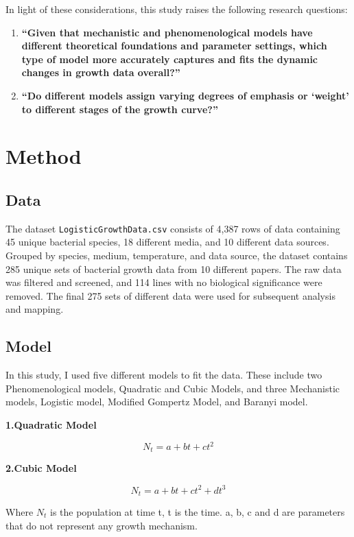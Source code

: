 \documentclass{article}
\begin{document}
In light of these considerations, this study raises the following research questions:

\begin{enumerate}
    \item \textbf{``Given that mechanistic and phenomenological models have different theoretical foundations and parameter settings, which type of model more accurately captures and fits the dynamic changes in growth data overall?''}
    
    \item \textbf{``Do different models assign varying degrees of emphasis or ‘weight’ to different stages of the growth curve?''}

\end{enumerate}

\section{Method}

\subsection{Data}

The dataset \texttt{LogisticGrowthData.csv} consists of 4,387 rows of data containing 45 unique bacterial species, 18 different media, and 10 different data sources. Grouped by species, medium, temperature, and data source, the dataset contains 285 unique sets of bacterial growth data from 10 different papers. The raw data was filtered and screened, and 114 lines with no biological significance were removed. The final 275 sets of different data were used for subsequent analysis and mapping.


\subsection{Model}

In this study, I used five different models to fit the data. These include two Phenomenological models, Quadratic and Cubic Models, and three Mechanistic models, Logistic model, Modified Gompertz Model, and Baranyi model.


\noindent \textbf{1.\;Quadratic Model}


\[
N_t = a + b t + c t^2 \tag{1}
\]


\noindent \textbf{2.\;Cubic Model}


\[
N_t = a + b t + c t^2 + d t^3 \tag{2}
\]

Where \( N_t \) is the population at time t, t is the time. a, b, c and d are parameters that do not represent any growth mechanism.
\end{document}
